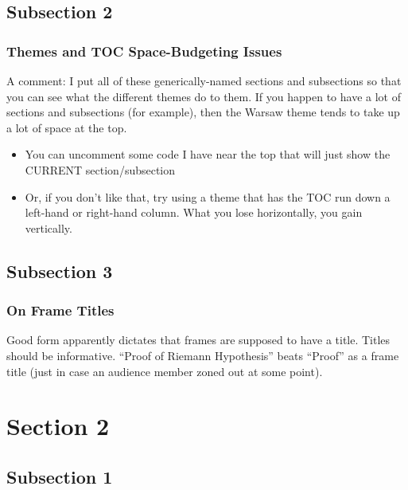 \documentclass[notes]{beamer}
\begin{document}
\subsection{Subsection 2}

\begin{frame}
\frametitle{Themes and TOC Space-Budgeting Issues}

\hypertarget{post_equalities}{}

A comment: I put all of these generically-named sections and subsections so that you can see what the different themes do to them.  If you happen to have a lot of sections and subsections (for example), then the Warsaw theme tends to take up a lot of space at the top.
\begin{itemize}
\item You can uncomment some code I have near the top that will just show the CURRENT section/subsection
\item Or, if you don't like that, try using a theme that has the TOC run down a left-hand or right-hand column.  What you lose horizontally, you gain vertically.
\end{itemize}

\end{frame}

\subsection{Subsection 3}

\begin{frame}
\frametitle{On Frame Titles}

Good form apparently dictates that frames are supposed to have a title.  Titles should be informative.  ``Proof of Riemann Hypothesis'' beats ``Proof'' as a frame title (just in case an audience member zoned out at some point).

\end{frame}

\section{Section 2}

\subsection{Subsection 1}
\end{document}
